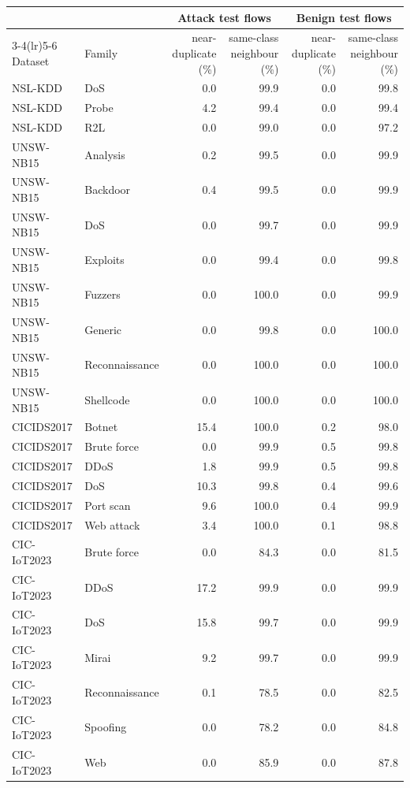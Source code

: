 \begin{tabular}{llrrrr}
\toprule
 & & \multicolumn{2}{c}{Attack test flows} & \multicolumn{2}{c}{Benign test flows} \\ \cmidrule(lr){3-4}\cmidrule(lr){5-6}
Dataset & Family & near-duplicate (\%) & same-class neighbour (\%) & near-duplicate (\%) & same-class neighbour (\%) \\
\midrule
NSL-KDD & DoS & 0.0 & 99.9 & 0.0 & 99.8 \\
NSL-KDD & Probe & 4.2 & 99.4 & 0.0 & 99.4 \\
NSL-KDD & R2L & 0.0 & 99.0 & 0.0 & 97.2 \\
UNSW-NB15 & Analysis & 0.2 & 99.5 & 0.0 & 99.9 \\
UNSW-NB15 & Backdoor & 0.4 & 99.5 & 0.0 & 99.9 \\
UNSW-NB15 & DoS & 0.0 & 99.7 & 0.0 & 99.9 \\
UNSW-NB15 & Exploits & 0.0 & 99.4 & 0.0 & 99.8 \\
UNSW-NB15 & Fuzzers & 0.0 & 100.0 & 0.0 & 99.9 \\
UNSW-NB15 & Generic & 0.0 & 99.8 & 0.0 & 100.0 \\
UNSW-NB15 & Reconnaissance & 0.0 & 100.0 & 0.0 & 100.0 \\
UNSW-NB15 & Shellcode & 0.0 & 100.0 & 0.0 & 100.0 \\
CICIDS2017 & Botnet & 15.4 & 100.0 & 0.2 & 98.0 \\
CICIDS2017 & Brute force & 0.0 & 99.9 & 0.5 & 99.8 \\
CICIDS2017 & DDoS & 1.8 & 99.9 & 0.5 & 99.8 \\
CICIDS2017 & DoS & 10.3 & 99.8 & 0.4 & 99.6 \\
CICIDS2017 & Port scan & 9.6 & 100.0 & 0.4 & 99.9 \\
CICIDS2017 & Web attack & 3.4 & 100.0 & 0.1 & 98.8 \\
CIC-IoT2023 & Brute force & 0.0 & 84.3 & 0.0 & 81.5 \\
CIC-IoT2023 & DDoS & 17.2 & 99.9 & 0.0 & 99.9 \\
CIC-IoT2023 & DoS & 15.8 & 99.7 & 0.0 & 99.9 \\
CIC-IoT2023 & Mirai & 9.2 & 99.7 & 0.0 & 99.9 \\
CIC-IoT2023 & Reconnaissance & 0.1 & 78.5 & 0.0 & 82.5 \\
CIC-IoT2023 & Spoofing & 0.0 & 78.2 & 0.0 & 84.8 \\
CIC-IoT2023 & Web & 0.0 & 85.9 & 0.0 & 87.8 \\
\bottomrule
\end{tabular}

